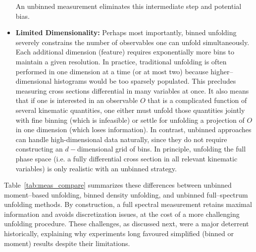 \begin{itemize}
            An unbinned measurement eliminates this intermediate step and potential bias.
        \item \textbf{Limited Dimensionality:}
            Perhaps most importantly, binned unfolding severely constrains the number of observables one can unfold simultaneously.
            Each additional dimension (feature) requires exponentially more bins to maintain a given resolution.
            In practice, traditional unfolding is often performed in one dimension at a time (or at most two) because higher--dimensional histograms would be too sparsely populated.
            This precludes measuring cross sections differential in many variables at once.
            It also means that if one is interested in an observable $O$ that is a complicated function of several kinematic quantities, one either must unfold those quantities jointly with fine binning (which is infeasible) or settle for unfolding a projection of $O$ in one dimension (which loses information).
            In contrast, unbinned approaches can handle high-dimensional data naturally, since they do not require constructing an \(d-\)dimensional grid of bins.
            In principle, unfolding the full phase space (i.e. a fully differential cross section in all relevant kinematic variables) is only realistic with an unbinned strategy.
    \end{itemize}        
    Table~\ref{tab:meas_compare} summarizes these differences between unbinned moment--based unfolding, binned density unfolding, and unbinned full--spectrum unfolding methods.
    By construction, a full spectral measurement retains maximal information and avoids discretization issues, at the cost of a more challenging unfolding procedure.
    These challenges, as discussed next, were a major deterrent historically, explaining why experiments long favoured simplified (binned or moment) results despite their limitations.
    
